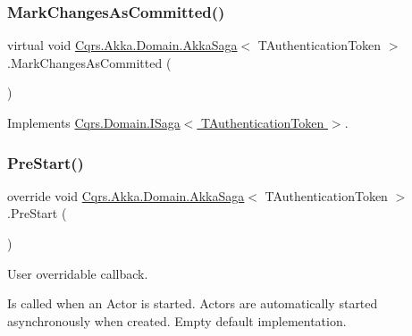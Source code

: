 \subsubsection{\texorpdfstring{Mark\+Changes\+As\+Committed()}{MarkChangesAsCommitted()}}
{\footnotesize\ttfamily virtual void \hyperlink{classCqrs_1_1Akka_1_1Domain_1_1AkkaSaga}{Cqrs.\+Akka.\+Domain.\+Akka\+Saga}$<$ T\+Authentication\+Token $>$.Mark\+Changes\+As\+Committed (\begin{DoxyParamCaption}{ }\end{DoxyParamCaption})\hspace{0.3cm}{\ttfamily [virtual]}}



Implements \hyperlink{interfaceCqrs_1_1Domain_1_1ISaga_a85c75f80bc5be4bad7f1d9f1231bfba7_a85c75f80bc5be4bad7f1d9f1231bfba7}{Cqrs.\+Domain.\+I\+Saga$<$ T\+Authentication\+Token $>$}.

\mbox{\label{classCqrs_1_1Akka_1_1Domain_1_1AkkaSaga_a4615beae56f595074f3ba643a890ba74_a4615beae56f595074f3ba643a890ba74}} 
\subsubsection{\texorpdfstring{Pre\+Start()}{PreStart()}}
{\footnotesize\ttfamily override void \hyperlink{classCqrs_1_1Akka_1_1Domain_1_1AkkaSaga}{Cqrs.\+Akka.\+Domain.\+Akka\+Saga}$<$ T\+Authentication\+Token $>$.Pre\+Start (\begin{DoxyParamCaption}{ }\end{DoxyParamCaption})\hspace{0.3cm}{\ttfamily [protected]}}



User overridable callback. 

Is called when an Actor is started. Actors are automatically started asynchronously when created. Empty default implementation. 

\mbox{\label{classCqrs_1_1Akka_1_1Domain_1_1AkkaSaga_a3f3cf1a10203a1eead599e7529d41613_a3f3cf1a10203a1eead599e7529d41613}} 
